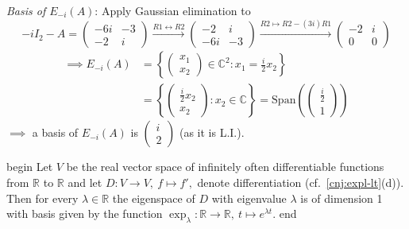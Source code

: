 \documentclass[
  12pt,
  a4paper,
  twoside]{article}
\theoremstyle{plain}
\theoremstyle{definition}
\begin{document}
\emph{Basis of \(E_{-i}(A)\)}:
Apply Gaussian elimination to
\[
-i I_{2} - A =
 \begin{pmatrix} -6i & -3 \\ -2 & i \end{pmatrix} \xrightarrow{R1 \leftrightarrow R2}
\begin{pmatrix} -2 & i \\ -6i & -3 \end{pmatrix} \xrightarrow{R2 \mapsto R2 -(3i)R1}
\begin{pmatrix} -2 & i \\ 0 & 0 \end{pmatrix}
\]
\begin{align*}
\implies E_{-i}(A) &= \left\{ \begin{pmatrix} x_{1} \\ x_{2} \end{pmatrix} \in \mathbb{C}^2 : x_{1}
= \frac{i}{2} x_{2} \right\} \\
&=\left\{ \begin{pmatrix} \frac{i}{2} x_{2} \\ x_{2} \end{pmatrix} : x_{2} \in \mathbb{C} \right\} = \mathrm{Span} \left( \begin{pmatrix} \frac{i}{2} \\ 1 \end{pmatrix} \right)
\end{align*}
\(\implies\) a basis of \(E_{-i}(A)\) is \(\begin{pmatrix} i \\ 2 \end{pmatrix}\) (as it is L.I.).

\csname begin\label{cnj:expl-eigen-diff}
Let \(V\) be the real vector space of infinitely often differentiable functions from \(\mathbb{R}\) to \(\mathbb{R}\) and let \(D: V \rightarrow V, \ f \mapsto f',\) denote differentiation (cf.~\ref{cnj:expl-lt}(d)). Then for every \(\lambda \in \mathbb{R}\) the eigenspace of \(D\) with eigenvalue \(\lambda\) is of dimension 1 with basis given by the function \(\exp_{\lambda}: \mathbb{R} \rightarrow \mathbb{R}, \ t \mapsto e^{\lambda t}\).
\csname end
\end{document}
